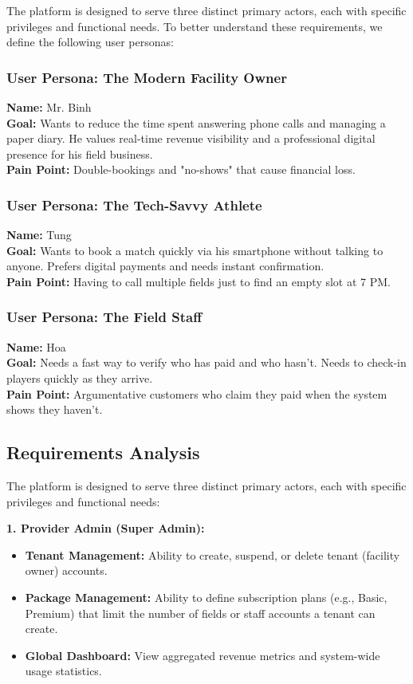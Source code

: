 The platform is designed to serve three distinct primary actors, each with specific privileges and functional needs. To better understand these requirements, we define the following user personas:

\subsubsection{User Persona: The Modern Facility Owner}
\textbf{Name:} Mr. Binh \\
\textbf{Goal:} Wants to reduce the time spent answering phone calls and managing a paper diary. He values real-time revenue visibility and a professional digital presence for his field business. \\
\textbf{Pain Point:} Double-bookings and "no-shows" that cause financial loss.

\subsubsection{User Persona: The Tech-Savvy Athlete}
\textbf{Name:} Tung \\
\textbf{Goal:} Wants to book a match quickly via his smartphone without talking to anyone. Prefers digital payments and needs instant confirmation. \\
\textbf{Pain Point:} Having to call multiple fields just to find an empty slot at 7 PM.

\subsubsection{User Persona: The Field Staff}
\textbf{Name:} Hoa \\
\textbf{Goal:} Needs a fast way to verify who has paid and who hasn't. Needs to check-in players quickly as they arrive. \\
\textbf{Pain Point:} Argumentative customers who claim they paid when the system shows they haven't.

\subsection{Requirements Analysis}
The platform is designed to serve three distinct primary actors, each with specific privileges and functional needs:

\textbf{1. Provider Admin (Super Admin):}
\begin{itemize}
    \item \textbf{Tenant Management:} Ability to create, suspend, or delete tenant (facility owner) accounts.
    \item \textbf{Package Management:} Ability to define subscription plans (e.g., Basic, Premium) that limit the number of fields or staff accounts a tenant can create.
    \item \textbf{Global Dashboard:} View aggregated revenue metrics and system-wide usage statistics.
\end{itemize}

